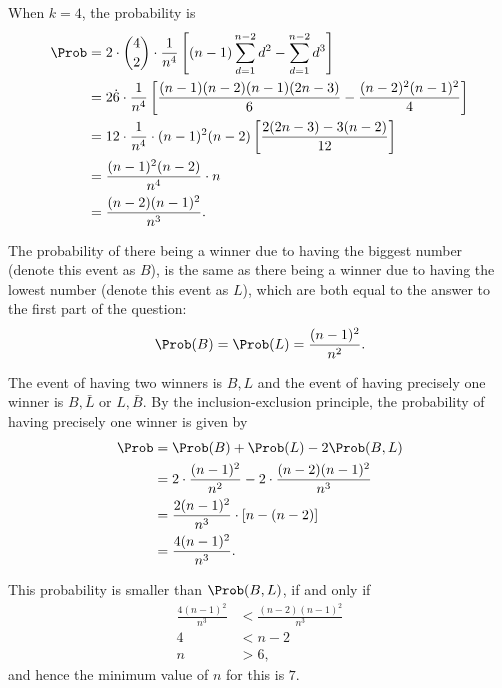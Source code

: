 \begin{enumerate}
          When \(k = 4\), the probability is
          \begin{align*}
              \Prob & = 2 \cdot \binom{4}{2} \cdot \frac{1}{n^4} \left[(n - 1) \sum_{d = 1}^{n - 2} d^{2} - \sum_{d = 1}^{n - 2} d^{3}\right] \\
                    & = 2 \dot 6 \cdot \frac{1}{n^4} \left[\frac{(n - 1) (n - 2) (n - 1) (2n - 3)}{6} - \frac{(n - 2)^2 (n - 1)^2}{4}\right]  \\
                    & = 12 \cdot \frac{1}{n^4} \cdot (n - 1)^2 (n - 2) \left[\frac{2 (2n - 3) - 3 (n - 2)}{12}\right]                         \\
                    & = \frac{(n - 1)^2 (n - 2)}{n^4} \cdot n                                                                                 \\
                    & = \frac{(n - 2) (n - 1)^2}{n^3}.
          \end{align*}

          The probability of there being a winner due to having the biggest number (denote this event as \(B\)), is the same as there being a winner due to having the lowest number (denote this event as \(L\)), which are both equal to the answer to the first part of the question:
          \begin{align*}
              \Prob(B) = \Prob(L) = \frac{(n - 1)^2}{n^2}.
          \end{align*}

          The event of having two winners is \(B, L\) and the event of having precisely one winner is \(B, \bar{L}\) or \(L, \bar{B}\). By the inclusion-exclusion principle, the probability of having precisely one winner is given by
          \begin{align*}
              \Prob & = \Prob(B) + \Prob(L) - 2 \Prob(B, L)                                  \\
                    & = 2 \cdot \frac{(n - 1)^2}{n^2} - 2 \cdot \frac{(n - 2)(n - 1)^2}{n^3} \\
                    & = \frac{2 (n - 1)^2}{n^3} \cdot \left[n - (n - 2)\right]               \\
                    & = \frac{4 (n - 1)^2}{n^3}.
          \end{align*}

          This probability is smaller than \(\Prob(B, L)\), if and only if
          \begin{align*}
              \frac{4(n - 1)^2}{n^3} & < \frac{(n - 2) (n - 1)^2}{n^3} \\
              4                      & < n - 2                         \\
              n                      & > 6,
          \end{align*}
          and hence the minimum value of \(n\) for this is \(7\).
\end{enumerate}